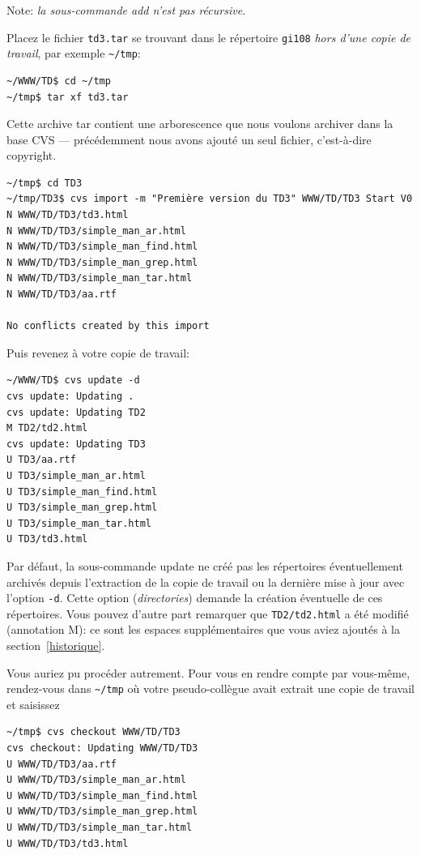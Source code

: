 \documentclass[11pt,a4paper]{article}
\begin{document}
\noindent
Note: \emph{la sous-commande \textsf{add} n'est pas récursive.}

\noindent
Placez le fichier \texttt{td3.tar} se trouvant dans le répertoire
\texttt{gi108} \emph{hors d'une copie de travail}, par exemple
\verb|~/tmp|:

{\small
\begin{verbatim}
~/WWW/TD$ cd ~/tmp
~/tmp$ tar xf td3.tar
\end{verbatim}
}

\noindent Cette archive \textsf{tar} contient une arborescence que
nous voulons archiver dans la base CVS --- précédemment nous avons
ajouté un seul fichier, c'est-à-dire \textsf{copyright}.

{\small
\begin{verbatim}
~/tmp$ cd TD3
~/tmp/TD3$ cvs import -m "Première version du TD3" WWW/TD/TD3 Start V0
N WWW/TD/TD3/td3.html
N WWW/TD/TD3/simple_man_ar.html
N WWW/TD/TD3/simple_man_find.html
N WWW/TD/TD3/simple_man_grep.html
N WWW/TD/TD3/simple_man_tar.html
N WWW/TD/TD3/aa.rtf

No conflicts created by this import
\end{verbatim}
}

\noindent
Puis revenez à votre copie de travail:

{\small
\begin{verbatim}
~/WWW/TD$ cvs update -d
cvs update: Updating .
cvs update: Updating TD2
M TD2/td2.html
cvs update: Updating TD3
U TD3/aa.rtf
U TD3/simple_man_ar.html
U TD3/simple_man_find.html
U TD3/simple_man_grep.html
U TD3/simple_man_tar.html
U TD3/td3.html
\end{verbatim}
}

Par défaut, la sous-commande \textsf{update} ne créé pas les répertoires
éventuellement archivés depuis l'extraction de la copie de travail ou
la dernière mise à jour avec l'option \texttt{-d}. Cette option
(\textsl{directories}) demande la création éventuelle de ces
répertoires. Vous pouvez d'autre part remarquer que
\texttt{TD2/td2.html} a été modifié (annotation \textsf{M}): ce sont
les espaces supplémentaires que vous aviez ajoutés à la
section~\ref{historique}.

Vous auriez pu procéder autrement. Pour vous en rendre compte par
vous-même, rendez-vous dans \verb|~/tmp| où votre pseudo-collègue
avait extrait une copie de travail et saisissez

{\small
\begin{verbatim}
~/tmp$ cvs checkout WWW/TD/TD3
cvs checkout: Updating WWW/TD/TD3
U WWW/TD/TD3/aa.rtf
U WWW/TD/TD3/simple_man_ar.html
U WWW/TD/TD3/simple_man_find.html
U WWW/TD/TD3/simple_man_grep.html
U WWW/TD/TD3/simple_man_tar.html
U WWW/TD/TD3/td3.html
\end{verbatim}
}
\end{document}
